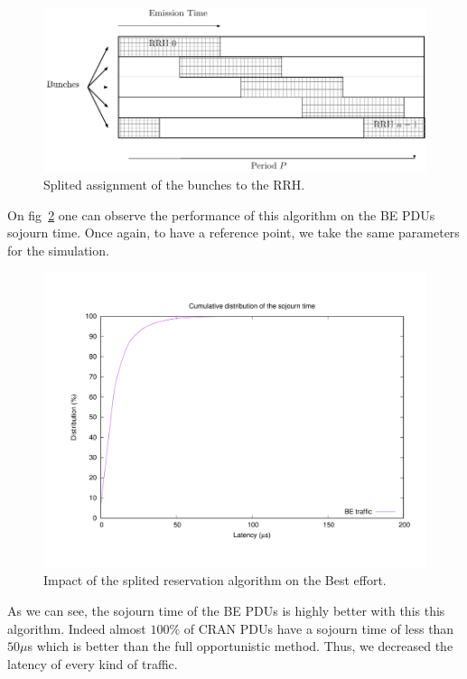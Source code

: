 \documentclass[a4paper,10pt,english]{article}
\begin{document}
   \begin{figure}[!h]

      \includegraphics[scale=0.7]{freqsplited.pdf}
     \caption{Splited assignment of the bunches to the RRH.}   \label{fig:freqS}
  \end{figure}
  
  On fig~\ref{fig:res2} one can observe the performance of this algorithm on the BE PDUs sojourn time. Once again, to have a reference point, we take the same parameters for the simulation.

 \begin{figure}[h]
\centering
      \includegraphics[scale=0.4]{res2.pdf}
     \caption{Impact of the splited reservation algorithm on the Best effort.}   \label{fig:res2}
  \end{figure}
  
  As we can see, the sojourn time of the BE PDUs is highly better with this this algorithm. Indeed almost $100\%$ of CRAN PDUs have a sojourn time of less than $50\mu$s which is better than the full opportunistic method. Thus, we decreased the latency of every kind of traffic.
\end{document}
